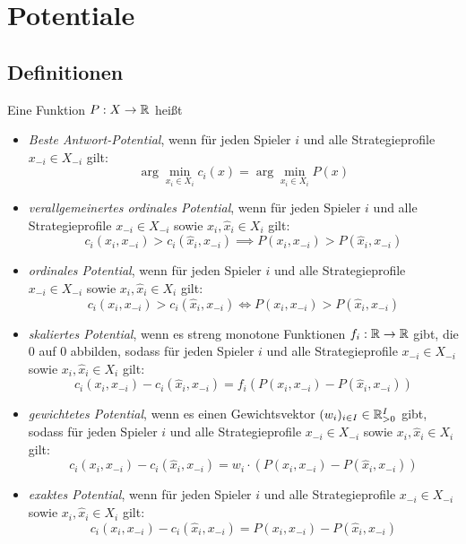 \section{Potentiale}\label{sec:Potentiale}

\subsection{Definitionen}

\begin{defn}
	Eine Funktion $P: X \to \mathbb{R}$ heißt
	\begin{itemize}
		\item \emph{Beste Antwort-Potential}, wenn für jeden Spieler $i$ und alle Strategieprofile $x_{-i} \in X_{-i}$ gilt:
			\[\arg \min_{x_i \in X_i}c_i(x) = \arg \min_{x_i \in X_i} P(x)\]
		\item \emph{verallgemeinertes ordinales Potential}, wenn für jeden Spieler $i$ und alle Strategieprofile $x_{-i} \in X_{-i}$ sowie $x_i, \hat{x}_i \in X_i$ gilt:
			\[c_i(x_i,x_{-i}) > c_i(\hat{x}_i, x_{-i}) \implies P(x_i,x_{-i}) > P(\hat{x}_i, x_{-i})\]
		\item \emph{ordinales Potential}, wenn für jeden Spieler $i$ und alle Strategieprofile $x_{-i} \in X_{-i}$ sowie $x_i, \hat{x}_i \in X_i$ gilt:
			\[c_i(x_i,x_{-i}) > c_i(\hat{x}_i, x_{-i}) \iff P(x_i,x_{-i}) > P(\hat{x}_i, x_{-i})\]
		\item \emph{skaliertes Potential}, wenn es streng monotone Funktionen $f_i: \mathbb{R} \to \mathbb{R}$ gibt, die $0$ auf $0$ abbilden, sodass für jeden Spieler $i$ und alle Strategieprofile $x_{-i} \in X_{-i}$ sowie $x_i, \hat{x}_i \in X_i$ gilt:
			\[c_i(x_i,x_{-i}) - c_i(\hat{x}_i, x_{-i}) = f_i(P(x_i,x_{-i}) - P(\hat{x}_i, x_{-i}))\]
		\item \emph{gewichtetes Potential}, wenn es einen Gewichtsvektor $(w_i)_{i\in I} \in \mathbb{R}_{>0}^I$ gibt, sodass für jeden Spieler $i$ und alle Strategieprofile $x_{-i} \in X_{-i}$ sowie $x_i, \hat{x}_i \in X_i$ gilt:
			\[c_i(x_i,x_{-i}) - c_i(\hat{x}_i, x_{-i}) = w_i\cdot(P(x_i,x_{-i}) - P(\hat{x}_i, x_{-i}))\]
		\item \emph{exaktes Potential}, wenn für jeden Spieler $i$ und alle Strategieprofile $x_{-i} \in X_{-i}$ sowie $x_i, \hat{x}_i \in X_i$ gilt:
			\[c_i(x_i,x_{-i}) - c_i(\hat{x}_i, x_{-i}) = P(x_i,x_{-i}) - P(\hat{x}_i, x_{-i})\]
	\end{itemize}
\end{defn}

